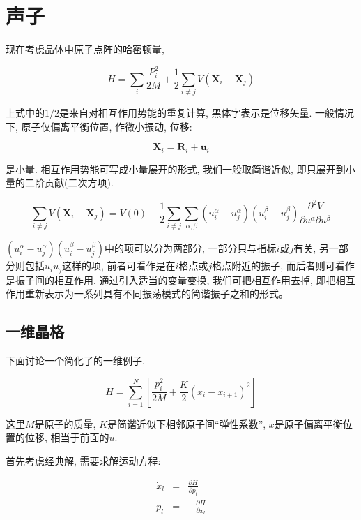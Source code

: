 \section{声子}


现在考虑晶体中原子点阵的哈密顿量,

\begin{equation}\label{lattice hamiltonian}
H = \sum_{i} \frac{P_{i}^2}{2M} +\frac{1}{2} \sum_{i \neq j} V(
\textbf{X}_{i} -\textbf{X}_{j} )
\end{equation}

上式中的$1/2$是来自对相互作用势能的重复计算, 黑体字表示是位移矢量.
一般情况下, 原子仅偏离平衡位置, 作微小振动, 位移:

\begin{equation*}
\textbf{X}_i = \textbf{R}_i + \textbf{u}_i
\end{equation*}

是小量. 相互作用势能可写成小量展开的形式, 我们一般取简谐近似,
即只展开到小量的二阶贡献(二次方项).

\begin{equation*}
\sum_{i \neq j} V(\textbf{X}_{i}-\textbf{X}_{j}) = V(0)+ \frac{1}{2}
\sum_{i \neq j} \sum_{\alpha, \beta} (u_i^{\alpha} - u_j^{\alpha})
(u_i^{\beta} - u_j^{\beta}) \frac{\partial ^2 V}{\partial u^{\alpha}
\partial u^{\beta}}
\end{equation*}


$(u_i^{\alpha} - u_j^{\alpha}) (u_i^{\beta} -
u_j^{\beta})$中的项可以分为两部分, 一部分只与指标$i$或$j$有关,
另一部分则包括$u_i u_j$这样的项,
前者可看作是在$i$格点或$j$格点附近的振子,
而后者则可看作是振子间的相互作用. 通过引入适当的变量变换,
我们可把相互作用去掉,
即把相互作用重新表示为一系列具有不同振荡模式的简谐振子之和的形式。

\subsection{一维晶格}

下面讨论一个简化了的一维例子,

\begin{equation*}
H = \sum_{i=1}^N\left[\frac{p_i^2}{2M} + \frac{K}{2} \left( x_i -
x_{i+1} \right)^2  \right]
\end{equation*}

这里$M$是原子的质量, $K$是简谐近似下相邻原子间“弹性系数”, $x$是原子偏离平衡位置的位移, 相当于前面的$u$.

首先考虑经典解, 需要求解运动方程:

\begin{eqnarray*}
\dot x_l &=& \frac{\partial H}{\partial p_l} \\
\dot p_l &=& - \frac{\partial H}{\partial x_l}
\end{eqnarray*}

